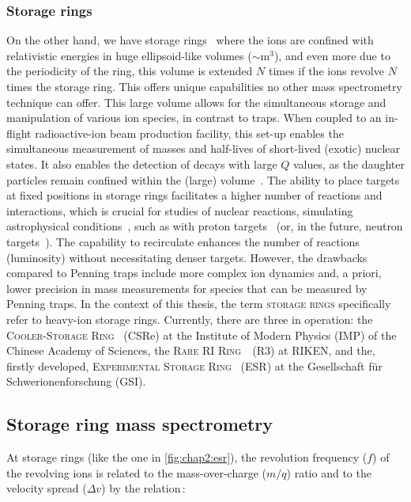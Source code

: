 \subsubsection{Storage rings}\label{subsubsec:intro:srings}
On the other hand, we have storage rings~\cite{STECK2020} where the ions are confined with relativistic energies in huge ellipsoid-like volumes ($\sim \mathrm{m}^{3}$), and even more due to the periodicity of the ring, this volume is extended $N$ times if the ions revolve $N$ times the storage ring. This offers unique capabilities no other mass spectrometry technique can offer. 
\newpar
This large volume allows for the simultaneous storage and manipulation of various ion species, in contrast to traps. When coupled to an in-flight radioactive-ion beam production facility, this set-up enables the simultaneous measurement of masses and half-lives of short-lived (exotic) nuclear states. 
It also enables the detection of decays with large $Q$ values, as the daughter particles remain confined within the (large) volume~\cite{LitvinovChen}.
The ability to place targets at fixed positions in storage rings facilitates a higher number of reactions and interactions, which is crucial for studies of nuclear reactions, simulating astrophysical conditions~\cite{Jan124Xe,GLORIUS2023,Dellmann2024}, such as with proton targets~\cite{gasjetESR} (or, in the future, neutron targets~\cite{reneReactor,reneTarget}). The capability to recirculate enhances the number of reactions (luminosity) without necessitating denser targets. However, the drawbacks compared to Penning traps include more complex ion dynamics and, a priori, lower precision in mass measurements for species that can be measured by Penning traps.
\newpar
In the context of this thesis, the term \textsc{storage rings} specifically refer to heavy-ion storage rings. Currently, there are three in operation: the \textsc{Cooler-Storage Ring}~\cite{CSRe} (\textsc{CSR}e) at the Institute of Modern Physics (\textsc{IMP}) of the Chinese Academy of Sciences, the \textsc{Rare RI Ring}~\cite{R3}~(\textsc{R3}) at \textsc{RIKEN}, and the, firstly developed, \textsc{Experimental Storage Ring}~\cite{ESR} (\textsc{ESR}) at the Gesellschaft für Schwerionenforschung (\textsc{GSI}).

\subsection{Storage ring mass spectrometry}\label{subsec:intro:storage_ring_mass_spectro}
At storage rings (like the one in \cref{fig:chap2:esr}), the revolution frequency ($f$) of the revolving ions is related to the mass-over-charge ($m/q$) ratio and to the velocity spread ($\Delta v$) by the relation\,\cite{Franzke-2008}:

